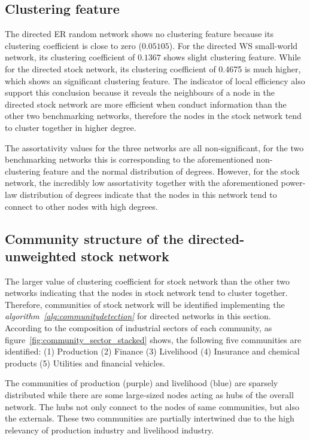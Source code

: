 \subsection{Clustering feature}
The directed ER random network shows no clustering feature because its clustering coefficient is close to zero ($0.05105$). For the directed WS small-world network, its clustering coefficient of $0.1367$ shows slight clustering feature. While for the directed stock network, its clustering coefficient of 0.4675 is much higher, which shows an significant clustering feature. The indicator of local efficiency also support this conclusion because it reveals the neighbours of a node in the directed stock network are more efficient when conduct information than the other two benchmarking networks, therefore the nodes in the stock network tend to cluster together in higher degree.

The assortativity values for the three networks are all non-significant, for the two benchmarking networks this is corresponding to the aforementioned non-clustering feature and the normal distribution of degrees. However, for the stock network, the incredibly low assortativity together with the aforementioned power-law distribution of degrees indicate that the nodes in this network tend to connect to other nodes with high degrees.

\subsection{Community structure of the directed-unweighted stock network}
The larger value of clustering coefficient for stock network than the other two networks indicating that the nodes in stock network tend to cluster together. Therefore, communities of stock network will be identified implementing the \textit{algorithm~\ref{alg:communitydetection}} for directed networks in this section. According to the composition of industrial sectors of each community, as figure~\ref{fig:community_sector_stacked} shows, the following five communities are identified: (1) Production (2) Finance (3) Livelihood (4) Insurance and chemical products (5) Utilities and financial vehicles.

The communities of production (purple) and livelihood (blue) are sparsely distributed while there are some large-sized nodes acting as hubs of the overall network. The hubs not only connect to the nodes of same communities, but also the externals. These two communities are partially intertwined due to the high relevancy of production industry and livelihood industry. 

